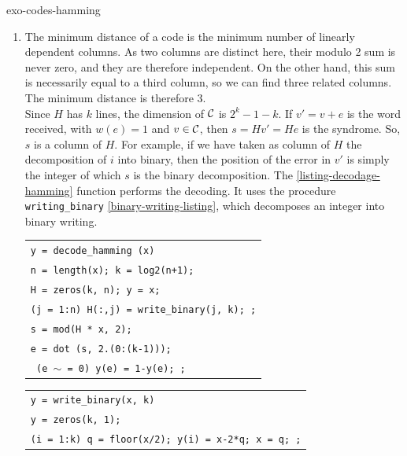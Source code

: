  
\begin{correction}{exo-codes-hamming}
\begin{enumerate}
\item {}  The minimum distance of a code is the minimum number of linearly dependent columns. As two columns are distinct here, their modulo 2 sum is never zero, and they are therefore independent. On the other hand, this sum is necessarily equal to a third column, so we can find three related columns. The minimum distance is therefore 3. \\Since $ H $ has $ k $ lines, the dimension of $ \mathcal{C} $ is $ 2^k-1-k $. If $ v'= v + e $ is the word received, with $ w (e) = 1 $ and $ v \in \mathcal{C} $, then $ s = H v' = H e $ is the syndrome. So, $ s $ is a column of $ H $. For example, if we have taken as  column of $ H $ the decomposition of $ i $ into binary, then the position of the error in $ v'$ is simply the integer of which $ s $ is the binary decomposition. The \Matlab{} \ref{listing-decodage-hamming} function performs the decoding. It uses the procedure \texttt{writing\_binary} \ref{binary-writing-listing}, which decomposes an integer into binary writing.

\begin{listing} \begin{footnotesize}
{\upshape
\begin{tabular}{l} \texttt{\pfunction y = decode\_hamming (x)} \\
\texttt{n = length(x); k = log2(n+1);} \\
\texttt{H = zeros(k, n); y = x;} \\
\texttt{\pfor{}(j = 1:n) H(:,j) = write\_binary(j, k); \pend{};} \\
\texttt{s = mod(H * x, 2);} \\
\texttt{e = dot (s, 2.{\hatverb}(0:(k-1)));} \\
\texttt{\pif{} (e $ \sim $ = 0) y(e) = 1-y(e); \pend{};} \\
\end{tabular}
}
\end{footnotesize}
\caption{Procedure \texttt{\upshape decode\_hamming}}
\label{listing-decodage-hamming}
\end{listing}
 
\begin{listing} \begin{footnotesize}
{\upshape
\begin{tabular}{l} \texttt{\pfunction y = write\_binary(x, k)} \\
\texttt{y = zeros(k, 1);} \\
\texttt{\pfor{}(i = 1:k) q = floor(x/2); y(i) = x-2*q; x = q; \pend{};} \\
\end{tabular}
}
\end{footnotesize}
\caption{Procedure \texttt{\upshape write\_binary}}
\label{binary-writing-listing}
\end{listing}
 

\end{enumerate}
\end{correction}
